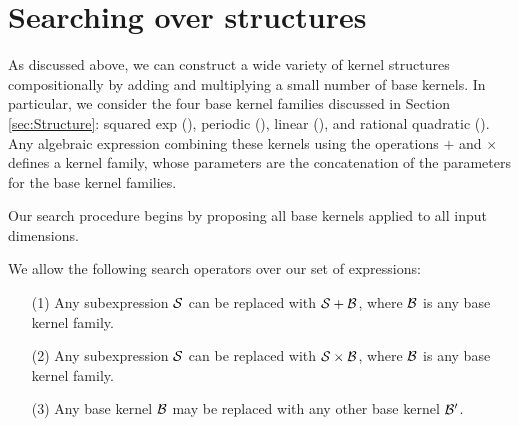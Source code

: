 \documentclass[twoside]{article}
\begin{document}

%

\section{Searching over structures}
\label{sec:Search}

As discussed above, we can construct a wide variety of kernel structures compositionally by adding and multiplying a small number of base kernels.
In particular, we consider the four base kernel families discussed in Section \ref{sec:Structure}: squared exp (\kSE), periodic (\kPer), linear (\kLin), and rational quadratic (\kRQ).
Any algebraic expression combining these kernels using the operations $+$ and $\times$ defines a kernel family, whose parameters are the concatenation of the parameters for the base kernel families. 

Our search procedure begins by proposing all base kernels applied to all input dimensions. 

We allow the following search operators over our set of expressions:
\begin{itemize}
\item[(1)] Any subexpression ${\cal S}$ can be replaced with ${\cal S} + {\cal B}$, where ${\cal B}$ is any base kernel family.
\item[(2)] Any subexpression ${\cal S}$ can be replaced with ${\cal S} \times {\cal B}$, where ${\cal B}$ is any base kernel family.
\item[(3)] Any base kernel ${\cal B}$ may be replaced with any other base kernel ${\cal B}^\prime$.
\end{itemize}
\end{document}
